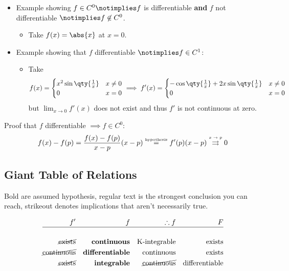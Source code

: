 \begin{itemize}
\tightlist
\item
  Example showing \(f\in C^0 \notimplies f\) is differentiable
  \textbf{and} \(f\) not differentiable \(\notimplies f \not\in C^0\).

  \begin{itemize}
  \tightlist
  \item
    Take \(f(x) = \abs{x}\) at \(x=0\).
  \end{itemize}
\item
  Example showing that \(f\) differentiable \(\notimplies f \in C^1\):

  \begin{itemize}
  \tightlist
  \item
    Take
    \begin{align*}
    f(x) = 
    \begin{cases}
    x^2\sin\qty{ \frac{1}{x} } & x \neq 0 \\ 
    0 & x =0
    \end{cases}
    \implies f'(x) = 
    \begin{cases}
    -\cos\qty{\frac{1}{x}} + 2x\sin\qty{ \frac{1}{x} } & x \neq 0 \\ 
    0 & x=0
    \end{cases}
    \end{align*} but \(\lim_{x\to 0}f'(x)\) does not exist and thus
    \(f'\) is not continuous at zero.
  \end{itemize}
\end{itemize}

Proof that \(f\) differentiable \(\implies f \in C^0\):
\begin{align*}
f(x) - f(p) = \frac{f(x)-f(p)}{x-p}(x-p) \stackrel{\tiny\mbox{hypothesis}}{=} f'(p)(x-p) \stackrel{\tiny\mbox{$x\to p$}}\rightrightarrows 0
\end{align*}

\hypertarget{giant-table-of-relations}{%
\subsection{Giant Table of Relations}\label{giant-table-of-relations}}

Bold are assumed hypothesis, regular text is the strongest conclusion
you can reach, strikeout denotes implications that aren't necessarily
true.

\begin{align*}
f' && f && \therefore f && F \\
\hline \\
\cancel{\text{exists}} && \mathbf{continuous} &&  \text{K-integrable} && \text{exists} \\
\cancel{\text{continuous}} && \mathbf{differentiable}  && \text{continuous} && \text{exists} \\
\cancel{\text{exists}} && \mathbf{integrable} && \cancel{\text{continuous}} && \text{differentiable} \\
\end{align*}

